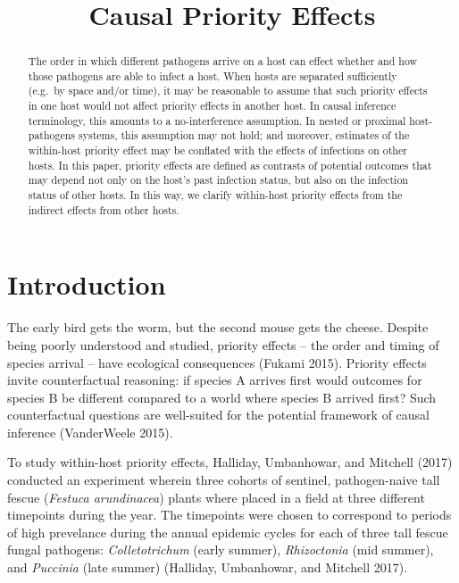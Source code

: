 \documentclass[]{article}
\title{Causal Priority Effects}
\author{}
\date{}
\begin{document}
\maketitle
\begin{abstract}
\noindent The order in which different pathogens arrive on a host can
effect whether and how those pathogens are able to infect a host. When
hosts are separated sufficiently (e.g.~by space and/or time), it may be
reasonable to assume that such priority effects in one host would not
affect priority effects in another host. In causal inference
terminology, this amounts to a no-interference assumption. In nested or
proximal host-pathogens systems, this assumption may not hold; and
moreover, estimates of the within-host priority effect may be conflated
with the effects of infections on other hosts. In this paper, priority
effects are defined as contrasts of potential outcomes that may depend
not only on the host's past infection status, but also on the infection
status of other hosts. In this way, we clarify within-host priority
effects from the indirect effects from other hosts.
\end{abstract}

\doublespacing

\section{Introduction}\label{introduction}

The early bird gets the worm, but the second mouse gets the cheese.
Despite being poorly understood and studied, priority effects -- the
order and timing of species arrival -- have ecological consequences
(Fukami 2015). Priority effects invite counterfactual reasoning: if
species A arrives first would outcomes for species B be different
compared to a world where species B arrived first? Such counterfactual
questions are well-suited for the potential framework of causal
inference (VanderWeele 2015).

To study within-host priority effects, Halliday, Umbanhowar, and
Mitchell (2017) conducted an experiment wherein three cohorts of
sentinel, pathogen-naive tall fescue (\emph{Festuca arundinacea}) plants
where placed in a field at three different timepoints during the year.
The timepoints were chosen to correspond to periods of high prevelance
during the annual epidemic cycles for each of three tall fescue fungal
pathogens: \emph{Colletotrichum} (early summer), \emph{Rhizoctonia} (mid
summer), and \emph{Puccinia} (late summer) (Halliday, Umbanhowar, and
Mitchell 2017).
\end{document}
